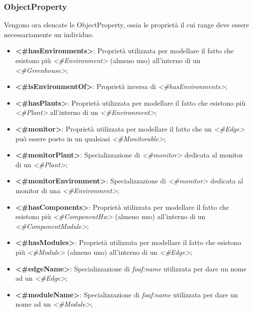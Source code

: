 \newcommand\boldYellow[1]{\textcolor{yellow(munsell)}{\textbf{#1}}}

\subsubsection{ObjectProperty}
Vengono ora elencate le ObjectProperty, ossia le proprietà il cui range deve essere necessariamente un individuo.
\begin{itemize}
	\item \textbf{<\#hasEnvironments>}: Proprietà utilizzata per modellare il fatto che esistono più \textit{<\#Environment>} (almeno uno) all'interno di un \textit{<\#Greenhouse>};

	\item \boldYellow{<\#isEnvironmentOf>}: Proprietà inversa di \textit{<\#hasEnvironments>};

	\item \textbf{<\#hasPlants>}: Proprietà utilizzata per modellare il fatto che esistono più \textit{<\#Plant>} all'interno di un \textit{<\#Environment>};

	\item \textbf{<\#monitor>}: Proprietà utilizzata per modellare il fatto che un \textit{<\#Edge>} può essere posto in un qualsiasi \textit{<\#Monitorable>};

	\item \textbf{<\#monitorPlant>}: Specializzazione di \textit{<\#monitor>} dedicata al monitor di un \textit{<\#Plant>};

	\item \textbf{<\#monitorEnvironment>}: Specializzazione di \textit{<\#monitor>} dedicata al monitor di una \textit{<\#Environment>};

	\item \textbf{<\#hasComponents>}: Proprietà utilizzata per modellare il fatto che esistono più \textit{<\#ComponentHw>} (almeno uno) all'interno di un \textit{<\#ComponentModule>};

	\item \textbf{<\#hasModules>}: Proprietà utilizzata per modellare il fatto che esistono più \textit{<\#Module>} (almeno uno) all'interno di un \textit{<\#Edge>};

	\item \textbf{<\#edgeName>}: Specializzazione di \textit{foaf:name} utilizzata per dare un nome ad un \textit{<\#Edge>};

	\item \textbf{<\#moduleName>}: Specializzazione di \textit{foaf:name} utilizzata per dare un nome ad un \textit{<\#Module>};


\end{itemize}
